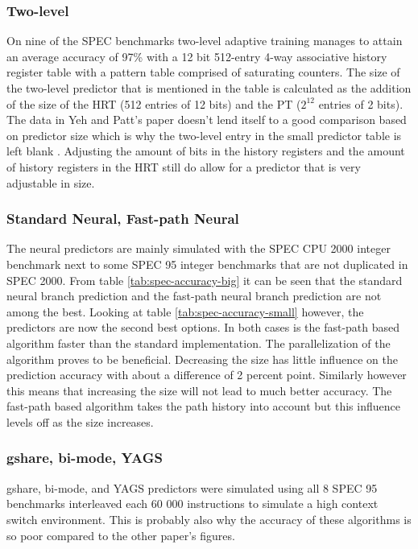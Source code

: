 \subsubsection*{Two-level}
On nine of the SPEC benchmarks two-level adaptive training manages to attain an average accuracy of 97\% with a 12 bit 512-entry 4-way associative history register table with a pattern table comprised of saturating counters. 
The size of the two-level predictor that is mentioned in the table is calculated as the addition of the size of the HRT (512 entries of 12 bits) and the PT ($2^{12}$ entries of 2 bits). 
The data in Yeh and Patt's paper doesn't lend itself to a good comparison based on predictor size which is why the two-level entry in the small predictor table is left blank \cite{twolevel}. 
Adjusting the amount of bits in the history registers and the amount of history registers in the HRT still do allow for a predictor that is very adjustable in size.


\subsubsection*{Standard Neural, Fast-path Neural}
The neural predictors are mainly simulated with the SPEC CPU 2000 integer benchmark next to some SPEC 95 integer benchmarks that are not duplicated in SPEC 2000. From table \ref{tab:spec-accuracy-big} it can be seen that the standard neural branch prediction and the fast-path neural branch prediction are not among the best. Looking at table \ref{tab:spec-accuracy-small} however, the predictors are now the second best options. In both cases is the fast-path based algorithm faster than the standard implementation. The parallelization of the algorithm proves to be beneficial. Decreasing the size has little influence on the prediction accuracy with about a difference of 2 percent point. Similarly however this means that increasing the size will not lead to much better accuracy. The fast-path based algorithm takes the path history into account but this influence levels off as the size increases.

\subsubsection*{gshare, bi-mode, YAGS}
gshare, bi-mode, and YAGS predictors were simulated using all 8 SPEC 95 benchmarks interleaved each 60 000 instructions to simulate a high context switch environment.
This is probably also why the accuracy of these algorithms is so poor compared to the other paper's figures.

